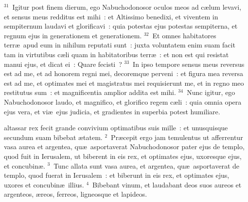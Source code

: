 ${}^{31}$~Igitur post finem dierum, ego Nabuchodonosor oculos meos ad c\ae lum levavi, et sensus meus redditus est mihi~: et Altissimo benedixi, et viventem in sempiternum laudavi et glorificavi~: quia potestas ejus potestas sempiterna, et regnum ejus in generationem et generationem.
${}^{32}$~Et omnes habitatores terr\ae\ apud eum in nihilum reputati sunt~: juxta voluntatem enim suam facit tam in virtutibus c\ae li quam in habitatoribus terr\ae~: et non est qui resistat manui ejus, et dicat ei~: Quare fecisti~?
${}^{33}$~In ipso tempore sensus meus reversus est ad me, et ad honorem regni mei, decoremque perveni~: et figura mea reversa est ad me, et optimates mei et magistratus mei requisierunt me, et in regno meo restitutus sum~: et magnificentia amplior addita est mihi.
${}^{34}$~Nunc igitur, ego Nabuchodonosor laudo, et magnifico, et glorifico regem c\ae li~: quia omnia opera ejus vera, et vi\ae\ ejus judicia, et gradientes in superbia potest humiliare.

\bchapter
{}altassar rex fecit grande convivium optimatibus suis mille~: et unusquisque secundum suam bibebat \ae tatem.
${}^{2}$~Pr\ae cepit ergo jam temulentus ut afferrentur vasa aurea et argentea, qu\ae\ asportaverat Nabuchodonosor pater ejus de templo, quod fuit in Ierusalem, ut biberent in eis rex, et optimates ejus, uxoresque ejus, et concubin\ae .
${}^{3}$~Tunc allata sunt vasa aurea, et argentea, qu\ae\ asportaverat de templo, quod fuerat in Ierusalem~: et biberunt in eis rex, et optimates ejus, uxores et concubin\ae\ illius.
${}^{4}$~Bibebant vinum, et laudabant deos suos aureos et argenteos, \ae reos, ferreos, ligneosque et lapideos.


